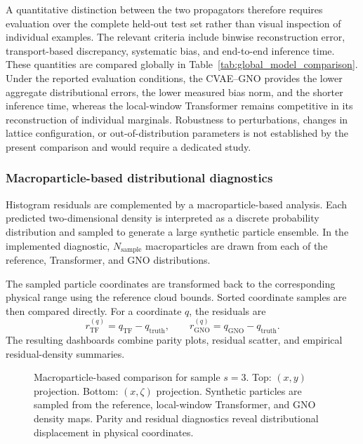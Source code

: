 A quantitative distinction between the two propagators therefore requires evaluation over the complete held-out test set rather than visual inspection of individual examples. The relevant criteria include binwise reconstruction error, transport-based discrepancy, systematic bias, and end-to-end inference time. These quantities are compared globally in Table~\ref{tab:global_model_comparison}. Under the reported evaluation conditions, the CVAE--GNO provides the lower aggregate distributional errors, the lower measured bias norm, and the shorter inference time, whereas the local-window Transformer remains competitive in its reconstruction of individual marginals. Robustness to perturbations, changes in lattice configuration, or out-of-distribution parameters is not established by the present comparison and would require a dedicated study.


\subsubsection{Macroparticle-based distributional diagnostics}
\label{subsubsec:results_macroparticle_comparison}

Histogram residuals are complemented by a macroparticle-based analysis. Each predicted two-dimensional density is interpreted as a discrete probability distribution and sampled to generate a large synthetic particle ensemble. In the implemented diagnostic, $N_{\mathrm{sample}}$ macroparticles are drawn from each of the reference, Transformer, and GNO distributions. 

The sampled particle coordinates are transformed back to the corresponding physical range using the reference cloud bounds. Sorted coordinate samples are then compared directly. For a coordinate \(q\), the residuals are
\begin{equation}
r_{\mathrm{TF}}^{(q)}
=
q_{\mathrm{TF}}
-
q_{\mathrm{truth}},
\qquad
r_{\mathrm{GNO}}^{(q)}
=
q_{\mathrm{GNO}}
-
q_{\mathrm{truth}}.
\label{eq:sampled_coordinate_residuals}
\end{equation}
The resulting dashboards combine parity plots, residual scatter, and empirical residual-density summaries.

\begin{figure}[p]
\centering
{}


\vspace{0.8em}


\caption{
Macroparticle-based comparison for sample \(s=3\). Top: \((x,y)\) projection. Bottom: \((x,\zeta)\) projection. Synthetic particles are sampled from the reference, local-window Transformer, and GNO density maps. Parity and residual diagnostics reveal distributional displacement in physical coordinates.
}
\label{fig:sampling_comparison_xy_xzeta}


\end{figure}

